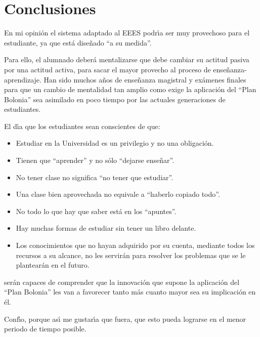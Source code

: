 \section{Conclusiones}


En mi opini\'{o}n el sistema  adaptado al EEES podr\'{\i}a ser muy provechoso
para el estudiante, ya que est\'{a} dise\~{n}ado
``a su medida''.


Para ello, el alumnado deber\'{a} mentalizarse que debe cambiar
su  actitud pasiva  por una actitud activa, para  sacar
el mayor provecho al proceso de ense\~{n}anza-aprendizaje.
Han sido muchos a\~{n}os de ense\~{n}anza magistral y ex\'{a}menes finales
para que un cambio de mentalidad tan amplio como  exige  la 
aplicaci\'{o}n del ``Plan Bolonia'' sea asimilado en poco tiempo 
por las actuales generaciones
de estudiantes.

 El d\'{\i}a que los estudiantes sean conscientes de que:
\begin{itemize} 
\item Estudiar en la Universidad es un privilegio y no una obligaci\'{o}n.
\item Tienen que ``aprender'' y no s\'{o}lo ``dejarse ense\~{n}ar''.
\item No tener clase no significa ``no tener que estudiar''.
\item Una clase bien aprovechada no equivale a ``haberlo copiado todo''.
\item No todo lo que hay que saber est\'{a} en los ``apuntes''.
\item Hay muchas formas de estudiar sin tener un libro delante.
\item Los conocimientos que no hayan adquirido por su cuenta, mediante todos los
recursos a su alcance, no les servir\'{a}n para resolver los problemas
que se le plantear\'{a}n en el futuro.
\end{itemize}
ser\'{a}n capaces de comprender que la innovaci\'{o}n que supone la 
aplicaci\'{o}n del ``Plan Bolonia'' les van a favorecer tanto m\'{a}s cuanto 
mayor sea su implicaci\'{o}n en \'{e}l.

Conf\'{\i}o, porque as\'{\i} me gustar\'{\i}a que fuera, que esto pueda
lograrse en el menor periodo de tiempo posible.



